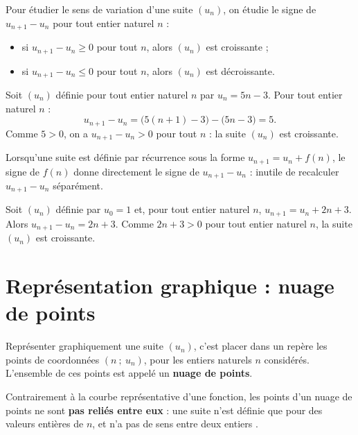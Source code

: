 \documentclass[10pt,a4paper]{article}
\begin{document}
\begin{met}
    Pour étudier le sens de variation d'une suite \((u_n)\), on étudie le signe de \(u_{n+1}-u_n\) pour tout entier naturel \(n\) :
    \begin{itemize}
        \item si \(u_{n+1}-u_n\geq 0\) pour tout \(n\), alors \((u_n)\) est croissante ;
        \item si \(u_{n+1}-u_n\leq 0\) pour tout \(n\), alors \((u_n)\) est décroissante.
    \end{itemize}
\end{met}

\begin{exple}
    Soit \((u_n)\) définie pour tout entier naturel \(n\) par \(u_n = 5n-3\). Pour tout entier naturel \(n\) :
    \[
    u_{n+1}-u_n = \big(5(n+1)-3\big)-\big(5n-3\big) = 5.
    \]
    Comme \(5>0\), on a \(u_{n+1}-u_n>0\) pour tout \(n\) : la suite \((u_n)\) est croissante.
\end{exple}

\begin{rem}
    Lorsqu'une suite est définie par récurrence sous la forme \(u_{n+1}=u_n+f(n)\), le signe de \(f(n)\) donne directement le signe de \(u_{n+1}-u_n\) : inutile de recalculer \(u_{n+1}-u_n\) séparément.
\end{rem}

\begin{exple}
    Soit \((u_n)\) définie par \(u_0=1\) et, pour tout entier naturel \(n\), \(u_{n+1}=u_n+2n+3\). Alors \(u_{n+1}-u_n = 2n+3\). Comme \(2n+3>0\) pour tout entier naturel \(n\), la suite \((u_n)\) est croissante.
\end{exple}

\section{Représentation graphique : nuage de points}

\begin{defi}
    Représenter graphiquement une suite \((u_n)\), c'est placer dans un repère les points de coordonnées \((n\ ;\ u_n)\), pour les entiers naturels \(n\) considérés. L'ensemble de ces points est appelé un \textbf{nuage de points}.
\end{defi}

\begin{rem}
    Contrairement à la courbe représentative d'une fonction, les points d'un nuage de points ne sont \textbf{pas reliés entre eux} : une suite n'est définie que pour des valeurs entières de \(n\), et n'a pas de sens \og entre deux entiers \fg{}.
\end{rem}
\end{document}
